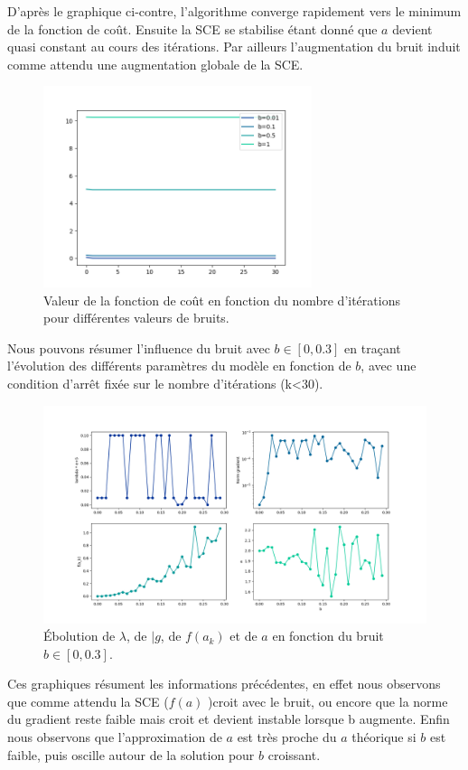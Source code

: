 \documentclass[12pt]{article}
\begin{document}
\begin{minipage}{0.45\textwidth}
D'après le graphique ci-contre, l'algorithme converge rapidement vers le minimum de la fonction de coût. Ensuite la SCE se stabilise  étant donné que $a$ devient quasi constant au cours des itérations. Par ailleurs l'augmentation du bruit induit comme attendu une augmentation globale de la SCE.

\end{minipage} \hfill
\begin{minipage}{0.5\textwidth}
\begin{figure}[H]
\includegraphics[width=0.7\textwidth]{Q10_F.png}
\caption{ Valeur de la fonction de coût en fonction du nombre d'itérations pour différentes valeurs de bruits.}
\label{FigQ10B01}
\end{figure}
\end{minipage}

Nous pouvons résumer l'influence du bruit avec  $b\in [0,0.3]$ en traçant l'évolution des différents paramètres du modèle en fonction de $b$, avec une condition d'arrêt fixée sur le nombre d'itérations (k<30).
\begin{figure}[H]
\centering
\includegraphics[width=1\textwidth]{Q10FF.png}
\caption{ Ébolution de $\lambda$, de $|g$, de $f(a_k)$ et de $a$ en fonction du bruit $b \in [0,0.3]$.}
\label{FigQ10B01}
\end{figure}
Ces graphiques résument les informations précédentes, en effet nous observons que comme attendu la SCE ($f(a)$ )croit avec le bruit, ou encore que la norme du gradient  reste faible mais croit et devient instable lorsque b augmente. Enfin nous observons que l'approximation de $a$ est très proche du $a$ théorique si $b$ est faible, puis oscille autour de la solution pour $b$ croissant.
\newpage
\end{document}
